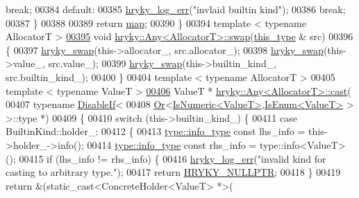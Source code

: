 \begin{DoxyCode}
{      break};
00384     \textcolor{keywordflow}{default}:
00385         \hyperlink{log__writer__common_8h_ae5ad3dabb33f594695ef40753cb78aad}{hryky_log_err}(\textcolor{stringliteral}{"invlaid builtin kind"});
00386         \textcolor{keywordflow}{break};
00387     \}
00388     
00389     \textcolor{keywordflow}{return} \hyperlink{namespacehryky_1_1reduction_ac5eae270cf8047b294dc4ff3e5e11a79}{map};
00390 \}
00394 \textcolor{keyword}{template} < \textcolor{keyword}{typename} AllocatorT >
\hypertarget{any_8h_source_l00395}{}\hyperlink{classhryky_1_1_any_a1603aaa3243f8aaae407c6a5e4287bb6}{00395} \textcolor{keywordtype}{void} \hyperlink{namespacehryky_a4282146df5ea2b68cb667896a2205909}{hryky::Any<AllocatorT>::swap}(\hyperlink{classhryky_1_1_any}{this_type} & src)
00396 \{
00397     \hyperlink{namespacehryky_add9c1c1fdfda07cd47bcb7c16d3a823a}{hryky_swap}(this->allocator\_, src.allocator\_);
00398     \hyperlink{namespacehryky_add9c1c1fdfda07cd47bcb7c16d3a823a}{hryky_swap}(this->value\_, src.value\_);
00399     \hyperlink{namespacehryky_add9c1c1fdfda07cd47bcb7c16d3a823a}{hryky_swap}(this->builtin\_kind\_, src.builtin\_kind\_);
00400 \}
00404 \textcolor{keyword}{template} < \textcolor{keyword}{typename} AllocatorT >
00405 \textcolor{keyword}{template} < \textcolor{keyword}{typename} ValueT >
\hypertarget{any_8h_source_l00406}{}\hyperlink{classhryky_1_1_any_a37f25821261f4c71fbe4f319837d327d}{00406} ValueT * \hyperlink{classhryky_1_1_any}{hryky::Any<AllocatorT>::cast}(
00407     \textcolor{keyword}{typename} \hyperlink{classhryky_1_1_disable_if}{DisableIf}<
00408         \hyperlink{classhryky_1_1_or}{Or}<\hyperlink{classhryky_1_1_is_numeric}{IsNumeric<ValueT>},\hyperlink{classhryky_1_1_is_enum}{IsEnum<ValueT>} > >::type *)
00409 \{
00410     \textcolor{keywordflow}{switch} (this->builtin\_kind\_) \{
00411     \textcolor{keywordflow}{case} BuiltinKind::holder\_:
00412         \{
00413             \hyperlink{classhryky_1_1type_1_1_info}{type::info_type} \textcolor{keyword}{const} lhs\_info = this->holder\_->info();
00414             \hyperlink{classhryky_1_1type_1_1_info}{type::info_type} \textcolor{keyword}{const} rhs\_info = type::info<ValueT>();
00415             \textcolor{keywordflow}{if} (lhs\_info != rhs\_info) \{
00416                 \hyperlink{log__writer__common_8h_ae5ad3dabb33f594695ef40753cb78aad}{hryky_log_err}(\textcolor{stringliteral}{"invalid kind for casting to arbitrary type."});
00417                 \textcolor{keywordflow}{return} \hyperlink{common_8h_a4cd4ac09cfcdbd6b30ee69afc156e210}{HRYKY_NULLPTR};
00418             \}
00419             \textcolor{keywordflow}{return} &(\textcolor{keyword}{static\_cast<}ConcreteHolder<ValueT> *\textcolor{keyword}{>}(

\end{DoxyCode}
